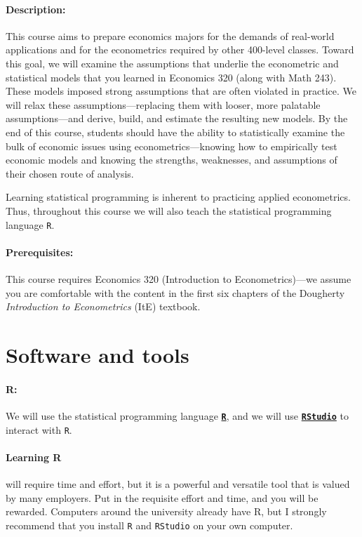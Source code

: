 \documentclass[10pt]{article}
\begin{document}
\paragraph{Description:} This course aims to prepare economics majors for the demands of real-world applications and for the econometrics required by other 400-level classes. Toward this goal, we will examine the assumptions that underlie the econometric and statistical models that you learned in Economics 320 (along with Math 243). These models imposed strong assumptions that are often violated in practice. We will relax these assumptions---replacing them with looser, more palatable assumptions---and derive, build, and estimate the resulting new models. By the end of this course, students should have the ability to statistically examine the bulk of economic issues using econometrics---knowing how to empirically test economic models and knowing the strengths, weaknesses, and assumptions of their chosen route of analysis.

Learning statistical programming is inherent to practicing applied econometrics. Thus, throughout this course we will also teach the statistical programming language \texttt{{R}}.

\paragraph{Prerequisites:} This course requires Economics 320 (Introduction to Econometrics)---we assume you are comfortable with the content in the first six chapters of the Dougherty \textit{Introduction to Econometrics} (ItE) textbook.

\section*{Software and tools}

\paragraph{R:} We will use the statistical programming language \href{https://www.r-project.org/}{\textbf{\texttt{R}}}, and we will use \href{https://posit.co/products/open-source/rstudio/}{\textbf{\texttt{RStudio}}} to interact with \texttt{R}.

\paragraph{Learning R} will require time and effort, but it is a powerful and versatile tool that is valued by many employers. Put in the requisite effort and time, and you will be rewarded. Computers around the university already have R, but I strongly recommend that you install \texttt{R} and \texttt{RStudio} on your own computer.
\end{document}
